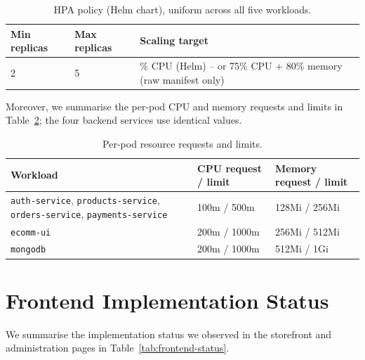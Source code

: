 \begin{table}[H]
\centering
\caption{HPA policy (Helm chart), uniform across all five workloads.}
\label{tab:hpa-actual}
\small
\begin{tabularx}{\textwidth}{l l >{\raggedright\arraybackslash}X}
\toprule
\textbf{Min replicas} & \textbf{Max replicas} & \textbf{Scaling target} \\
\midrule
2 & 5 & 75\% CPU (Helm) -- or 75\% CPU + 80\% memory (raw manifest only) \\
\bottomrule
\end{tabularx}
\end{table}

Moreover, we summarise the per-pod CPU and memory requests and limits in
Table~\ref{tab:resource-sizing}; the four backend services use identical values.

\begin{table}[H]
\centering
\caption{Per-pod resource requests and limits.}
\label{tab:resource-sizing}
\small
\begin{tabularx}{\textwidth}{>{\raggedright\arraybackslash}p{4.4cm} X X}
\toprule
\textbf{Workload} & \textbf{CPU request / limit} & \textbf{Memory request / limit} \\
\midrule
\texttt{auth-service}, \texttt{products-service}, \texttt{orders-service}, \texttt{payments-service} & 100m / 500m & 128Mi / 256Mi \\
\texttt{ecomm-ui} & 200m / 1000m & 256Mi / 512Mi \\
\texttt{mongodb} & 200m / 1000m & 512Mi / 1Gi \\
\bottomrule
\end{tabularx}
\end{table}

\clearpage
\section{Frontend Implementation Status}\label{sec:frontend-completeness}
We summarise the implementation status we observed in the storefront and
administration pages in Table~\ref{tab:frontend-status}.

